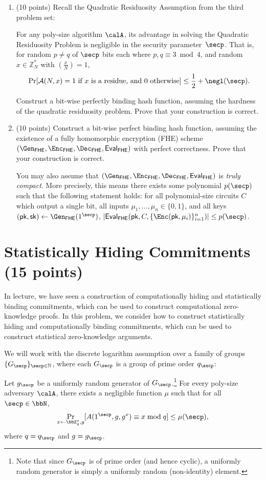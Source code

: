 \documentclass{article}
\newcommand{\pk}{\mathsf{pk}}
\newcommand{\sk}{\mathsf{sk}}
\begin{document}
\begin{enumerate}
    \item (10 points) Recall the Quadratic Residuosity Assumption from the third problem set:
    \begin{assumption}
        For any poly-size algorithm $\calA$, its advantage in solving the Quadratic Residuosity Problem is negligible in the security parameter~$\secp$.
        That is, for random $p \neq q$ of $\secp$ bits each where $p, q \equiv 3 \bmod{4}$, and random
        $x \in \mathbb{Z}_N^*$ with $\left( \frac{x}{N} \right) = 1$,
            \[ \Pr[\mathcal{A}(N, x) = 1 \text{ if } x \text{ is a residue, and } 0 \text{ otherwise}] \leq \frac{1}{2} + \negl(\secp). \]
    \end{assumption}
    Construct a bit-wise perfectly binding hash function, assuming the hardness of the quadratic residuosity problem. Prove that your construction is correct.
    \item (10 points) Construct a bit-wise perfect binding hash function, assuming the existence of a fully homomorphic encryption (FHE) scheme $(\Gen_{\FHE}, \Enc_{\FHE}, \Dec_{\FHE}, \Eval_{\FHE})$ with perfect correctness. Prove that your construction is correct.
    
    You may also assume that $(\Gen_{\FHE}, \Enc_{\FHE}, \Dec_{\FHE}, \Eval_{\FHE})$ is \emph{truly compact}. More precisely, this means there exists some polynomial $p(\secp)$ such that the following statement holds: for all polynomial-size circuits $C$ which output a single bit, all inputs $\mu_1, \ldots, \mu_n \in \{0, 1\}$, and all keys $(\pk, \sk) \gets \Gen_{\FHE}(1^{\secp})$, $|\Eval_{\FHE}(\pk, C, \{\Enc(\pk, \mu_i)\}_{i=1}^n)| \leq p(\secp)$.
\end{enumerate}
\newpage
\section{Statistically Hiding Commitments (15 points)}
In lecture, we have seen a construction of computationally hiding and statistically binding commitments, which can be used to construct computational zero-knowledge proofs. In this problem, we consider how to construct statistically hiding and computationally binding commitments, which can be used to construct statistical zero-knowledge arguments.

We will work with the discrete logarithm assumption over a family of groups $\{G_\secp\}_{\secp\in\mathbb{N}}$, where each $G_\secp$ is a group of prime order $q_\secp$:
\begin{assumption}
    Let $g_\secp$ be a uniformly random generator of $G_\secp$.\footnote{Note that since $G_{\secp}$ is of prime order (and hence cyclic), a uniformly random generator is simply a uniformly random (non-identity) element.} For every poly-size adversary $\calA$, there exists a negligible function $\mu$ such that for all $\secp \in \bbN$,
        \[ \Pr_{x \gets \bbZ_q^{*}, g}[A(1^{\secp}, g, g^x) \equiv x \bmod{q}] \leq \mu(\secp), \]
    where $q=q_\secp$ and $g = g_\secp$.
\end{assumption}
\end{document}
